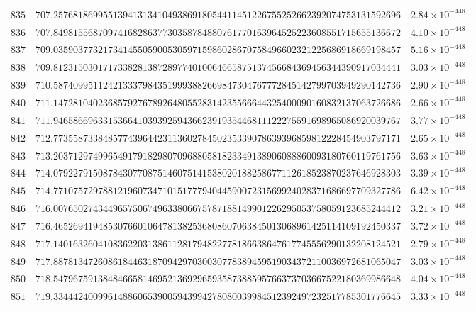 \documentclass[12pt,reqno]{amsart}
\theoremstyle{remark}
\begin{document}
\begin{longtable}{clc}
$835$ & $707.2576818699551394131341049386918054411451226755252662392074753131592696$ & $2.84\times 10^{-448}$ \\
$836$ & $707.8498155687097416828637730358784880761770163964525223608551715655136672$ & $4.10\times 10^{-448}$ \\
$837$ & $709.0359037732173414550590053059715986028670758496602321225686918669198457$ & $5.16\times 10^{-448}$ \\
$838$ & $709.8123150301717338281387289774010064665875137456684369456344390917034441$ & $3.03\times 10^{-448}$ \\
$839$ & $710.5874099511242133379843519993882669847304767772845142799703949290142736$ & $2.90\times 10^{-448}$ \\
$840$ & $711.1472810402368579276789264805528314235566644325400090160832137063726686$ & $2.66\times 10^{-448}$ \\
$841$ & $711.9465866963315366410393925943662391935446811122275591698965086920039767$ & $3.77\times 10^{-448}$ \\
$842$ & $712.7735587338485774396442311360278450235339078639396859812228454903797171$ & $2.65\times 10^{-448}$ \\
$843$ & $713.2037129749965491791829807096880581823349138906088860093180760119761756$ & $3.63\times 10^{-448}$ \\
$844$ & $714.0792279150878430770875146075141538020188258677112618523870237646928303$ & $3.39\times 10^{-448}$ \\
$845$ & $714.7710757297881219607347101517779404459007231569924028371686697709327786$ & $6.42\times 10^{-448}$ \\
$846$ & $716.0076502743449657506749633806675787188149901226295053758059123685244412$ & $3.21\times 10^{-448}$ \\
$847$ & $716.4652694194853076601064781382536808607063845013068961425114109192450337$ & $3.72\times 10^{-448}$ \\
$848$ & $717.1401632604108362203138611281794822778186638647617745556290132208124521$ & $2.79\times 10^{-448}$ \\
$849$ & $717.8878134726086184463187094297030030778389459519034372110036972681065047$ & $3.03\times 10^{-448}$ \\
$850$ & $718.5479675913848466581469521369296593587388595766373703667522180369986648$ & $4.04\times 10^{-448}$ \\
$851$ & $719.3344424009961488606539005943994278080039984512392497232517785301776645$ & $3.33\times 10^{-448}$ \\

\end{longtable}
\end{document}
